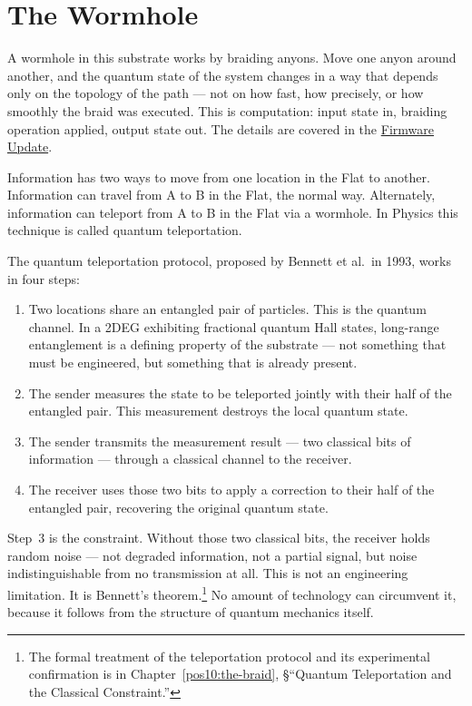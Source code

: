 \section*{The Wormhole}
\label{what-is-the-flat:the-wormhole}

A wormhole in this substrate works by braiding anyons. Move one anyon around another, and the quantum state of the system changes in a way that depends only on the topology of the path --- not on how fast, how precisely, or how smoothly the braid was executed. This is computation: input state in, braiding operation applied, output state out. The details are covered in the \hyperref[app:llm-primer]{Firmware Update}.

Information has two ways to move from one location in the Flat to another. Information can travel from A to B in the Flat, the normal way. Alternately, information can teleport from A to B in the Flat via a wormhole. In Physics this technique is called quantum teleportation.

The quantum teleportation protocol, proposed by Bennett et al.\ in 1993, works in four steps:

\begin{enumerate}
\item Two locations share an entangled pair of particles. This is the quantum channel. In a 2DEG exhibiting fractional quantum Hall states, long-range entanglement is a defining property of the substrate --- not something that must be engineered, but something that is already present.

\item The sender measures the state to be teleported jointly with their half of the entangled pair. This measurement destroys the local quantum state.

\item The sender transmits the measurement result --- two classical bits of information --- through a classical channel to the receiver.

\item The receiver uses those two bits to apply a correction to their half of the entangled pair, recovering the original quantum state.
\end{enumerate}

Step~3 is the constraint. Without those two classical bits, the receiver holds random noise --- not degraded information, not a partial signal, but noise indistinguishable from no transmission at all. This is not an engineering limitation. It is Bennett's theorem.\footnote{The formal treatment of the teleportation protocol and its experimental confirmation is in Chapter~\ref{pos10:the-braid}, \S``Quantum Teleportation and the Classical Constraint.''} No amount of technology can circumvent it, because it follows from the structure of quantum mechanics itself.

